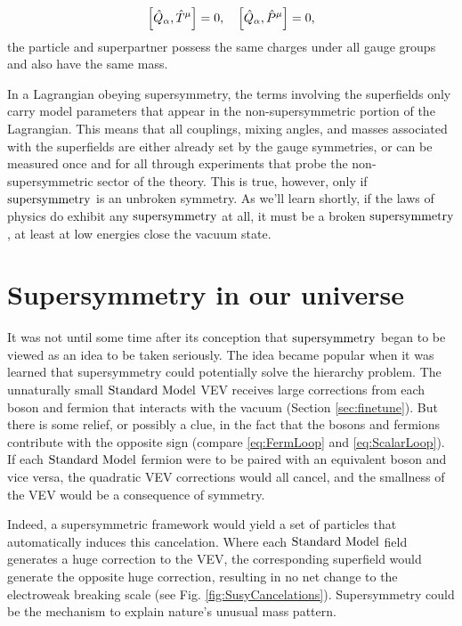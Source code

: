 \begin{equation}
\comm{\hat{Q}_{\alpha}}{\hat{T}^\mu}=0,\text{\ \ \ }\comm{\hat{Q}_\alpha}{\hat{P}^\mu}=0,
\end{equation}
the particle and superpartner possess the same charges under all gauge groups and also have the same mass. 

In a Lagrangian obeying supersymmetry, the terms involving the superfields only carry model parameters that appear in the non-supersymmetric portion of the Lagrangian. This means that all couplings, mixing angles, and masses associated with the superfields are either already set by the gauge symmetries, or can be measured once and for all through experiments that probe the non-supersymmetric sector of the theory. This is true, however, only if $\text{supersymmetry}$ is an unbroken symmetry. As we'll learn shortly, if the laws of physics do exhibit any $\text{supersymmetry}$ at all, it must be a broken $\text{supersymmetry}$, at least at low energies close the vacuum state.

\section{Supersymmetry in our universe}

It was not until some time after its conception that $\text{supersymmetry}$ began to be viewed as an idea to be taken seriously.  The idea became popular when it was learned that supersymmetry could potentially solve the hierarchy problem. The unnaturally small $\text{Standard\ Model}$ VEV receives large corrections from each boson and fermion that interacts with the vacuum (Section \ref{sec:finetune}). But there is some relief, or possibly a clue, in the fact that the bosons and fermions contribute with the opposite sign (compare \ref{eq:FermLoop} and \ref{eq:ScalarLoop}). If each $\text{Standard\ Model}$ fermion were to be paired with an equivalent boson and vice versa, the quadratic VEV corrections would all cancel, and the smallness of the VEV would be a consequence of symmetry.

Indeed, a supersymmetric framework would yield a set of particles that automatically induces this cancelation. Where each $\text{Standard\ Model}$ field generates a huge correction to the VEV,  the corresponding superfield would generate the opposite huge correction, resulting in no net change to the electroweak breaking scale (see Fig. \ref{fig:SusyCancelations}). Supersymmetry could be the mechanism to explain nature's unusual mass pattern.

